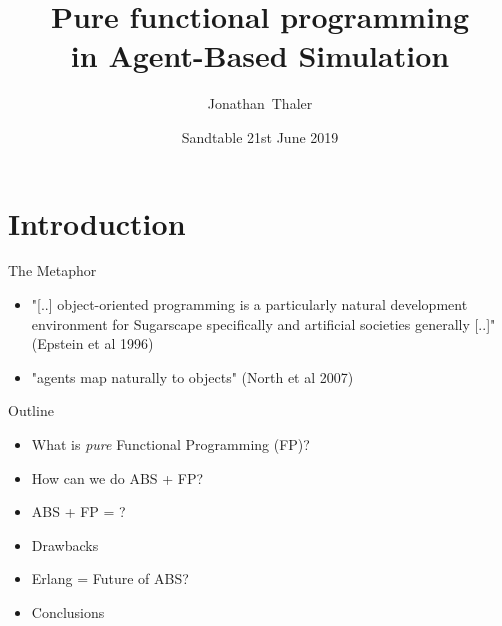 \documentclass{beamer} %
\title[Pure functional programming in Agent-Based Simulation] 
{%
  Pure functional programming \\ in Agent-Based Simulation
}
\author[Thaler]
{
  Jonathan~Thaler
}
\institute[University of Nottingham, Nottingham, United Kingdom]
{
  University of Nottingham, Nottingham, United Kingdom
}
\date[Sandtable 21st June 2019]
{Sandtable 21st June 2019}
\begin{document}
\begin{frame}
  \titlepage
\end{frame}

\section{Introduction}
\begin{frame}{The Metaphor}
\begin{itemize}
  \item "[..] object-oriented programming is a particularly natural development environment for Sugarscape specifically and artificial societies generally [..]" (Epstein et al 1996)
  
  \item "agents map naturally to objects" (North et al 2007)
\end{itemize}
\end{frame}

\begin{frame}{Outline}
\begin{itemize}
  
  \item What is \textit{pure} Functional Programming (FP)?
  \item How can we do ABS + FP?  
  \item ABS + FP = ?
  \item Drawbacks
  \item Erlang = Future of ABS?
  \item Conclusions
\end{itemize}
\end{frame}
\end{document}

